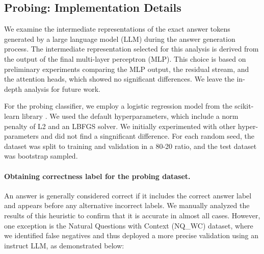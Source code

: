 \documentclass{article} %
\begin{document}
\subsection{Probing: Implementation Details}
\label{app:probe_implementation}

We examine the intermediate representations of the exact answer tokens generated by a large language model (LLM) during the answer generation process. The intermediate representation selected for this analysis is derived from the output of the final multi-layer perceptron (MLP). This choice is based on preliminary experiments comparing the MLP output, the residual stream, and the attention heads, which showed no significant differences. 
We leave the in-depth analysis for future work.

For the probing classifier, we employ a logistic regression model from the scikit-learn library \citep{scikit-learn}. We used the default hyperparameters, which include a norm penalty of L2 and an LBFGS solver.
We initially experimented with other hyper-parameters and did not find a singnificant difference.
For each random seed, the dataset was split to training and validation in a 80-20 ratio, and the test dataset was bootstrap sampled.

\paragraph{Obtaining correctness label for the probing dataset.}
An answer is generally considered correct if it includes the correct answer label and appears before any alternative incorrect labels. We manually analyzed the results of this heuristic to confirm that it is accurate in almost all cases.
However, one exception is the Natural Questions with Context (NQ\_WC) dataset, where we identified false negatives and thus deployed a more precise validation using an instruct LLM, as demonstrated below:
\end{document}
